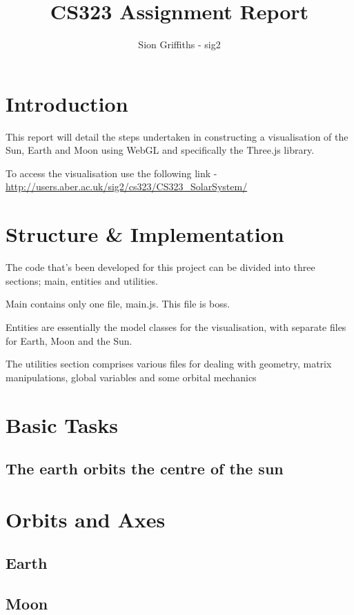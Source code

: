 \documentclass[titlepage]{article}
\title{CS323 Assignment Report}
\author{Sion Griffiths - sig2}
\begin{document}
\maketitle
\tableofcontents




\newpage
\section{Introduction}

This report will detail the steps undertaken in constructing a visualisation of the Sun, Earth and Moon using WebGL and specifically the Three.js library.

To access the visualisation use the following link -  \url{http://users.aber.ac.uk/sig2/cs323/CS323\_SolarSystem/}

\section{Structure \& Implementation}
The code that's been developed for this project can be divided into three sections; main, entities and utilities.

Main contains only one file, main.js. This file is boss.

Entities are essentially the model classes for the visualisation, with separate files for Earth, Moon and the Sun.

The utilities section comprises various files for dealing with geometry, matrix manipulations, global variables and some orbital mechanics 

\section{Basic Tasks}
\subsection{The earth orbits the centre of the sun}


\section{Orbits and Axes}
\subsection{Earth}
\subsection{Moon}
\end{document}
